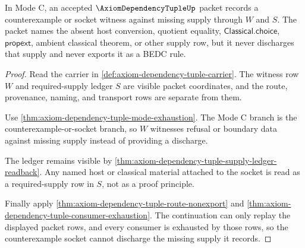 \begin{theorem}
\label{thm:axiom-dependency-tuple-counterexample-socket-boundary}
In Mode C, an accepted $\AxiomDependencyTupleUp$ packet records a
counterexample or socket witness against missing supply through $W$ and $S$.
The packet names the absent host conversion, quotient equality,
$\mathsf{Classical.choice}$, $\mathsf{propext}$, ambient classical theorem, or
other supply row, but it never discharges that supply and never exports it as
a BEDC rule.
\end{theorem}
\begin{proof}
Read the carrier in \autoref{def:axiom-dependency-tuple-carrier}. The witness
row $W$ and required-supply ledger $S$ are visible packet coordinates, and the
route, provenance, naming, and transport rows are separate from them.

Use \autoref{thm:axiom-dependency-tuple-mode-exhaustion}. The Mode C branch is
the counterexample-or-socket branch, so $W$ witnesses refusal or boundary data
against missing supply instead of providing a discharge.

The ledger remains visible by
\autoref{thm:axiom-dependency-tuple-supply-ledger-readback}. Any named host or
classical material attached to the socket is read as a required-supply row in
$S$, not as a proof principle.

Finally apply \autoref{thm:axiom-dependency-tuple-route-nonexport} and
\autoref{thm:axiom-dependency-tuple-consumer-exhaustion}. The continuation can
only replay the displayed packet rows, and every consumer is exhausted by those
rows, so the counterexample socket cannot discharge the missing supply it
records.
\end{proof}

